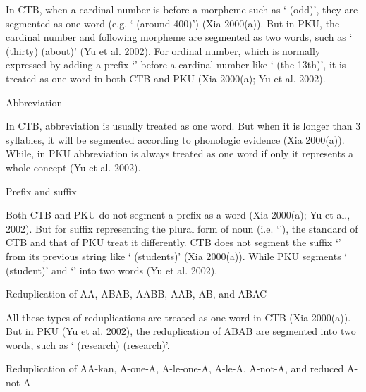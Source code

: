 \documentclass[english]{jnlp_1.4}
\renewcommand{\subsubsection}{}
\begin{document}
In CTB, when a cardinal number is before a morpheme such as 
` (odd)', they are segmented as one word (e.g. 
` (around 400)') (Xia 2000(a)). But in PKU, the 
cardinal number and following morpheme are segmented as two words, such as 
` (thirty)  (about)' (Yu et al. 2002). 
For ordinal number, which is normally expressed by adding a prefix 
`' before a cardinal number like ` (the 13th)', it is treated as one word in both CTB and PKU (Xia 
2000(a); Yu et al. 2002).

\subsubsection{Abbreviation}

In CTB, abbreviation is usually treated as one word. But when it is longer 
than 3 syllables, it will be segmented according to phonologic evidence (Xia 
2000(a)). While, in PKU abbreviation is always treated as one word if only 
it represents a whole concept (Yu et al. 2002).

\subsubsection{Prefix and suffix}

Both CTB and PKU do not segment a prefix as a word (Xia 2000(a); Yu et al., 
2002). But for suffix representing the plural form of noun (i.e. `'), 
the standard of CTB and that of PKU treat it differently. CTB does not 
segment the suffix `' from its previous string like 
` (students)' (Xia 2000(a)). While PKU segments 
` (student)' and `' into two words (Yu et al. 
2002).

\subsubsection{Reduplication of AA, ABAB, AABB, AAB, AB, and ABAC}

All these types of reduplications are treated as one word in CTB (Xia 
2000(a)). But in PKU (Yu et al. 2002), the reduplication of ABAB are 
segmented into two words, such as ` (research) 
 (research)'.

\subsubsection{Reduplication of AA-kan, A-one-A, A-le-one-A, A-le-A, A-not-A, and reduced A-not-A}
\end{document}
